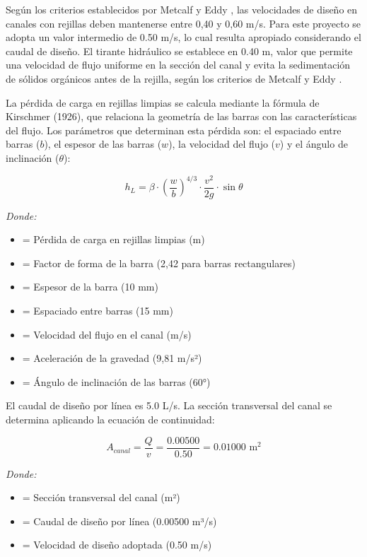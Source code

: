 \documentclass[12pt,a4paper]{article}
\begin{document}
Según los criterios establecidos por Metcalf y Eddy \cite{metcalf2014}, las velocidades de diseño en canales con rejillas deben mantenerse entre 0,40 y 0,60 m/s. Para este proyecto se adopta un valor intermedio de 0.50 m/s, lo cual resulta apropiado considerando el caudal de diseño. El tirante hidráulico se establece en 0.40 m, valor que permite una velocidad de flujo uniforme en la sección del canal y evita la sedimentación de sólidos orgánicos antes de la rejilla, según los criterios de Metcalf y Eddy \cite{metcalf2014}.

La pérdida de carga en rejillas limpias se calcula mediante la fórmula de Kirschmer (1926), que relaciona la geometría de las barras con las características del flujo. Los parámetros que determinan esta pérdida son: el espaciado entre barras ($b$), el espesor de las barras ($w$), la velocidad del flujo ($v$) y el ángulo de inclinación ($\theta$):

\begin{equation}
h_L = \beta \cdot \left(\frac{w}{b}\right)^{4/3} \cdot \frac{v^2}{2g} \cdot \sin\theta
\end{equation}

\textit{Donde:}
\begin{itemize}[noitemsep,leftmargin=2em]
    \item[$h_L$] = Pérdida de carga en rejillas limpias (m)
    \item[$\beta$] = Factor de forma de la barra (2,42 para barras rectangulares)
    \item[$w$] = Espesor de la barra (10 mm)
    \item[$b$] = Espaciado entre barras (15 mm)
    \item[$v$] = Velocidad del flujo en el canal (m/s)
    \item[$g$] = Aceleración de la gravedad (9,81 m/s²)
    \item[$\theta$] = Ángulo de inclinación de las barras (60°)
\end{itemize}

El caudal de diseño por línea es 5.0 L/s. La sección transversal del canal se determina aplicando la ecuación de continuidad:

\begin{equation}
A_{canal} = \frac{Q}{v} = \frac{0.00500}{0.50} = 0.01000 \text{ m}^2
\end{equation}

\textit{Donde:}
\begin{itemize}[noitemsep,leftmargin=2em]
    \item[$A_{canal}$] = Sección transversal del canal (m²)
    \item[$Q$] = Caudal de diseño por línea (0.00500 m³/s)
    \item[$v$] = Velocidad de diseño adoptada (0.50 m/s)
\end{itemize}
\end{document}
